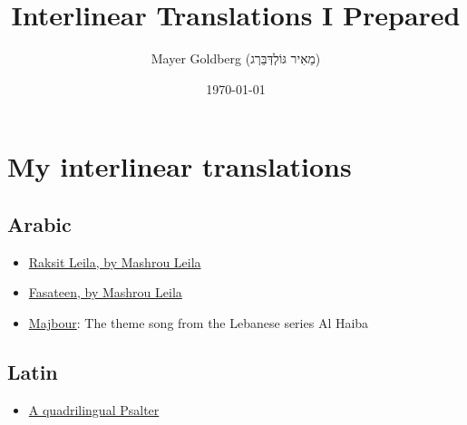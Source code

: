 \documentclass[11pt]{article}
\author{Mayer Goldberg (מֵאִיר גּוֹלְדְּבֵּרְג)}
\date{\today}
\title{Interlinear Translations I Prepared}
\begin{document}
\maketitle
\tableofcontents


\section{My interlinear translations}
\label{sec:org044b94f}
\subsection{Arabic}
\label{sec:orgeaa65b7}
\begin{itemize}
\item \href{./arabic-interlinear-translations/mashrou-leila-rakset-leilah.pdf}{Raksit Leila, by Mashrou Leila}
\item \href{./arabic-interlinear-translations/mashrou-leila-fasateen.pdf}{Fasateen, by Mashrou Leila}
\item \href{./arabic-interlinear-translations/al-haiba-theme-song=majbour.pdf}{Majbour}: The theme song from the Lebanese series Al Haiba
\end{itemize}
\subsection{Latin}
\label{sec:org6873ac6}
\begin{itemize}
\item \href{./psalter.html}{A quadrilingual Psalter}
\end{itemize}
\end{document}
